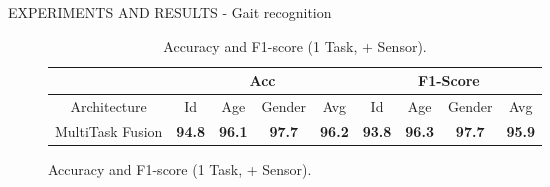 \documentclass[10pt]{beamer}
\begin{document}
\begin{frame}{EXPERIMENTS AND RESULTS - Gait recognition}
\begin{minipage}{\linewidth}
\begin{minipage}{0.45\linewidth}
\begin{figure}[htbp]
                \centering
                \begin{table}[h!]
                    \centering
                    \begin{adjustbox}{max width=\textwidth}
                    \begin{tabular}{|c||ccc|c||ccc|c|}
                        \hline
                            & \multicolumn{4}{c||}{Acc} & \multicolumn{4}{c|}{F1-Score} \\
                        \hline
                            Architecture & Id & Age & Gender & Avg & Id & Age & Gender & Avg\\
                        \hline
                            MultiTask Fusion & \bfseries{94.8} & \bfseries{96.1} & \bfseries{97.7} & \bfseries{96.2} & \bfseries{93.8} & \bfseries{96.3} & \bfseries{97.7} & \bfseries{95.9}\\
                        \hline 
                    \end{tabular}
                    \end{adjustbox}
                    \caption{Accuracy and F1-score (1 Task, + Sensor).}
                    \label{table accuracy and F1 (+ Task, + Sensor)}
                \end{table}
            \end{figure}
        \end{minipage}
    \end{minipage}
\end{frame}
\end{document}
